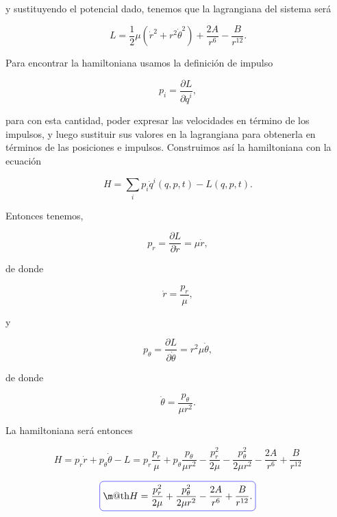 \documentclass[a4paper,10pt]{article}
\makeatletter
\numberwithin{equation}{section}
\newcommand*{\boxcolor}{blue}
\renewcommand{\boxed}[1]{\textcolor{\boxcolor}{%
\tikz[baseline={([yshift=-1ex]current bounding box.center)}] \node [rectangle, minimum width=1ex,rounded corners,draw] {\normalcolor\m@th$\displaystyle#1$};}}
\makeatother
\begin{document}
y sustituyendo el potencial dado, tenemos que la lagrangiana del sistema será

\begin{equation}
 L = \frac{1}{2}\mu(\dot{r}^2 + r^2\dot{\theta}^2) + \frac{2A}{r^6} 
 - \frac{B}{r^{12}}.
\end{equation}

Para encontrar la hamiltoniana usamos la definición de impulso 

\begin{equation}
 p_i = \frac{\partial L}{\partial \dot{q}^i},
\end{equation}

para con esta cantidad, poder expresar las velocidades en término de los impulsos, y luego 
sustituir sus valores en la lagrangiana para obtenerla en términos de las posiciones 
e impulsos. Construimos así la hamiltoniana con la ecuación 

\begin{equation}
 H = \sum_i p_i\dot{q}^i(q,p,t) - L(q,p,t).
\end{equation}

Entonces tenemos, 

\begin{equation}
 p_r = \frac{\partial L}{\partial \dot{r}} = \mu\dot{r},
\end{equation}

de donde 

\begin{equation}
 \dot{r} = \frac{p_r}{\mu},
\end{equation}

y 

\begin{equation}
 p_\theta = \frac{\partial L}{\partial \dot{\theta}} = r^2\mu\dot{\theta},
\end{equation}

de donde 

\begin{equation}
 \dot{\theta} = \frac{p_\theta}{\mu r^2}.
\end{equation}

La hamiltoniana será entonces 

\begin{equation}
 H = p_r\dot{r} + p_\theta \dot{\theta} - L = 
 p_r\frac{p_r}{\mu} + p_\theta\frac{p_\theta}{\mu r^2} - 
 \frac{p_r^2}{2\mu} - \frac{p_\theta^2}{2\mu r^2} - \frac{2A}{r^6} 
 + \frac{B}{r^{12}}
\end{equation}

\begin{equation}
 \boxed{H = \frac{p_r^2}{2\mu} + \frac{p_\theta^2}{2\mu r^2} 
 -\frac{2A}{r^6}  + \frac{B}{r^{12}}.}
\end{equation}
\end{document}
